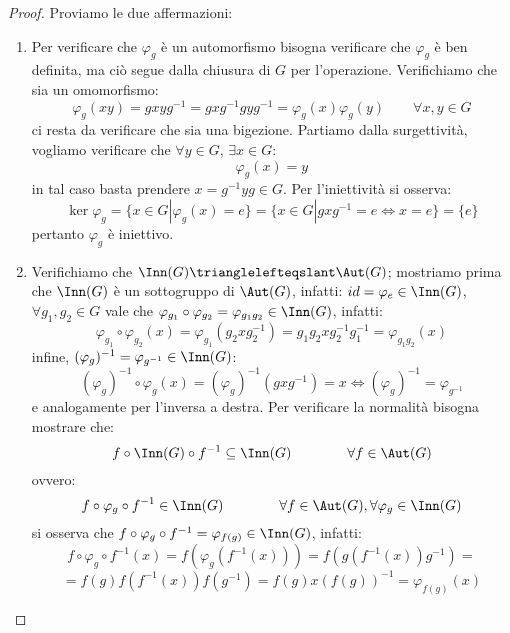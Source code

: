\documentclass[11pt]{scrartcl}
\begin{document}
\begin{proof}
    Proviamo le due affermazioni:
        \begin{enumerate}[(1)]
            \item Per verificare che $\varphi_g$ è un automorfismo bisogna verificare che $\varphi_g$ è ben definita, ma ciò segue dalla chiusura di $G$ per l'operazione.
                Verifichiamo che sia un omomorfismo:
                    \[ \varphi_g(xy) = g x y g^{-1} = gxg^{-1}gyg^{-1} = \varphi_g(x)\varphi_g(y)
                    \qquad \forall x,y \in G 
                        \]
                ci resta da verificare che sia una bigezione. Partiamo dalla surgettività, vogliamo verificare che $\forall y \in G$, $\exists x \in G :$
                    \[ \varphi_g(x) = y
                        \]
                in tal caso basta prendere $x = g^{-1}yg \in G$. Per l'iniettività si osserva:
                    \[ \ker \varphi_g = \{x \in G | \varphi_g(x) = e\} = \{x \in G | gxg^{-1} = e \iff x = e\} = \{e\}
                        \]
                pertanto $\varphi_g$ è iniettivo.
            \item Verifichiamo che $\Inn(G) \trianglelefteqslant \Aut(G)$; mostriamo prima che $\Inn(G)$ è un sottogruppo di $\Aut(G)$, infatti: 
            $id = \varphi_e \in \Inn(G)$, $\forall g_1,g_2 \in G$ vale che $\varphi_{g_{1}} \circ \varphi_{g_{2}} = \varphi_{g_1g_2} \in \Inn(G)$, infatti:
                    \[ \varphi_{g_{1}} \circ \varphi_{g_{2}}(x) = \varphi_{g_{1}}(g_2xg_2^{-1}) = g_1g_2xg_2^{-1}g_1^{-1} = \varphi_{g_1g_2}(x)
                        \]
                infine, $(\varphi_{g})^{-1} = \varphi_{g^{-1}} \in \Inn(G)$:
                    \[ (\varphi_{g})^{-1} \circ \varphi_{g}(x) = (\varphi_{g})^{-1} (gxg^{-1}) = x \iff (\varphi_{g})^{-1} = \varphi_{g^{-1}}
                        \]
                e analogamente per l'inversa a destra. Per verificare la normalità bisogna mostrare che:
                    \[ f \circ \Inn(G) \circ f^{-1} \subseteq \Inn(G)
                    \qquad \qquad \forall f \in \Aut(G)
                        \]
                ovvero:
                    \[ f \circ \varphi_g \circ f^{-1} \in \Inn(G)
                    \qquad \qquad \forall f \in \Aut(G), \forall \varphi_g \in \Inn(G)
                        \]
                si osserva che $f \circ \varphi_g \circ f^{-1} = \varphi_{f(g)} \in \Inn(G)$, infatti:
                    \[ f \circ \varphi_g \circ f^{-1} (x) = f(\varphi_g(f^{-1} (x))) = f(g(f^{-1}(x))g^{-1}) =
                        \]\[ = f(g) f(f^{-1}(x)) f(g^{-1}) = f(g) x (f(g))^{-1} = \varphi_{f(g)}(x)
                            \]
        \end{enumerate}
\end{proof}
\end{document}
